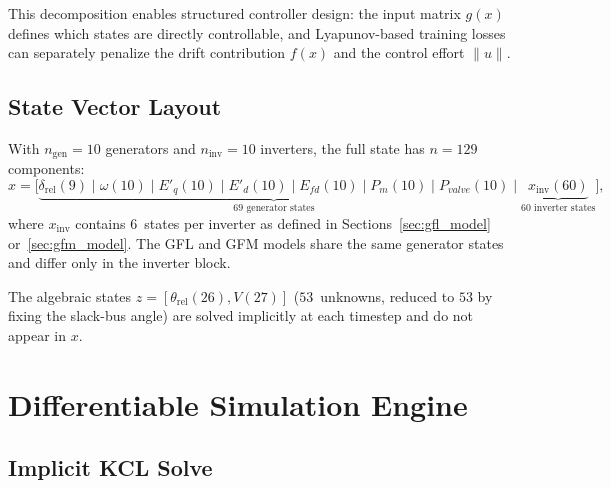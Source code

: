 \documentclass[11pt]{article}
\begin{document}
This decomposition enables structured controller design: the input
matrix $g(x)$ defines which states are directly controllable, and
Lyapunov-based training losses can separately penalize the drift
contribution $f(x)$ and the control effort $\|u\|$.


\subsection{State Vector Layout}
\label{sec:state_layout}

With $n_{\mathrm{gen}} = 10$ generators and $n_{\mathrm{inv}} = 10$
inverters, the full state has $n = 129$ components:
\begin{equation}
  x = \bigl[\underbrace{\delta_{\mathrm{rel}}(9)
    \mid \omega(10) \mid E'_q(10) \mid E'_d(10)
    \mid E_{fd}(10) \mid P_m(10) \mid P_{valve}(10)}_{
    \text{69 generator states}}
  \mid \underbrace{x_{\mathrm{inv}}(60)}_{
    \text{60 inverter states}}\bigr],
  \label{eq:state_layout}
\end{equation}
where $x_{\mathrm{inv}}$ contains 6~states per inverter as defined in
Sections~\ref{sec:gfl_model} or~\ref{sec:gfm_model}.  The GFL and GFM
models share the same generator states and differ only in the inverter
block.

The algebraic states $z = [\theta_{\mathrm{rel}}(26), V(27)]$
($53$~unknowns, reduced to $53$ by fixing the slack-bus angle) are
solved implicitly at each timestep and do not appear in $x$.

\section{Differentiable Simulation Engine}
\label{sec:diff_engine}

\subsection{Implicit KCL Solve}
\label{sec:newton}
\end{document}
